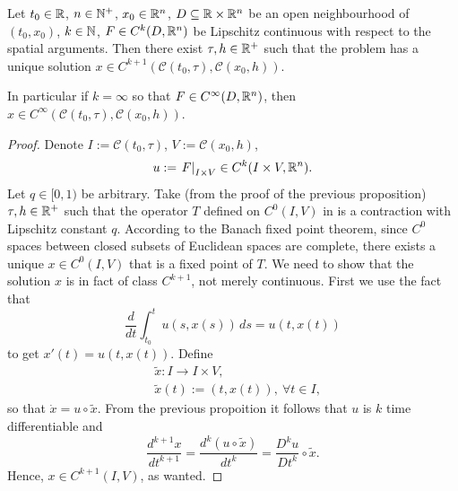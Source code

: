 \begin{theorem}
  Let
    $t_0 \in \mathbb{R}$,
    $n \in \mathbb{N}^+$,
    $x_0 \in \mathbb{R}^n$,
    $D \subseteq \mathbb{R} \times \mathbb{R}^n$ be an open neighbourhood of $(t_0, x_0)$,
    $k \in \mathbb{N}$,
    $F \in C^k(D, \mathbb{R}^n)$ be
      Lipschitz continuous with respect to the spatial arguments.
  Then there exist $\tau, h \in \mathbb{R}^+$ such that the problem
  has a unique solution
  $x \in C^{k + 1}(\mathcal{C}(t_0, \tau), \mathcal{C}(x_0, h))$.

  In particular if $k = \infty$ so that $F \in C^\infty(D, \mathbb{R}^n)$, then
  $x \in C^\infty(\mathcal{C}(t_0, \tau), \mathcal{C}(x_0, h))$.
\end{theorem}
\begin{proof}
  Denote
    $I := \mathcal{C}(t_0, \tau)$,
    $V := \mathcal{C}(x_0, h)$,
  \begin{equation}
     u := \left. F \right|_{I \times V} \in C^k(I \times V, \mathbb{R}^n).
   \end{equation} 
  Let $q \in [0, 1)$ be arbitrary.
  Take (from the proof of the previous proposition) $\tau, h \in \mathbb{R}^+$ such that
  the operator $T$ defined on
  $C^0(I, V)$ in
  is a contraction with Lipschitz constant $q$.
  According to the Banach fixed point theorem, since $C^0$ spaces between closed
  subsets of Euclidean spaces are complete, there exists a unique
  $x \in C^0(I, V)$ that is a fixed point
  of $T$.
  We need to show that the solution $x$ is in fact of class $C^{k + 1}$, not
  merely continuous.
  First we use the fact that
  \begin{equation}
    \frac{d}{d t} \int_{t_0}^t u(s, x(s))\, d s = u(t, x(t))
  \end{equation}
  to get $x'(t) = u(t, x(t))$.
  Define
  \begin{subequations}
    \begin{alignat}{1}
      & \tilde{x} \colon I \to I \times V, \\
      & \tilde{x}(t) := (t, x(t)),\ \forall t \in I,
    \end{alignat}
  \end{subequations}
  so that $\dot{x} = u \circ \tilde{x}$.
  From the previous propoition it follows that $u$ is $k$ time differentiable
  and
  \begin{equation}
    \frac{d^{k + 1} x}{d t^{k + 1}}
    = \frac{d^k (u \circ \tilde{x})}{d t^k}
    = \frac{D^k u}{D t^k} \circ \tilde{x}.
  \end{equation}
  Hence, $x \in C^{k + 1}(I, V)$, as wanted.
\end{proof}
